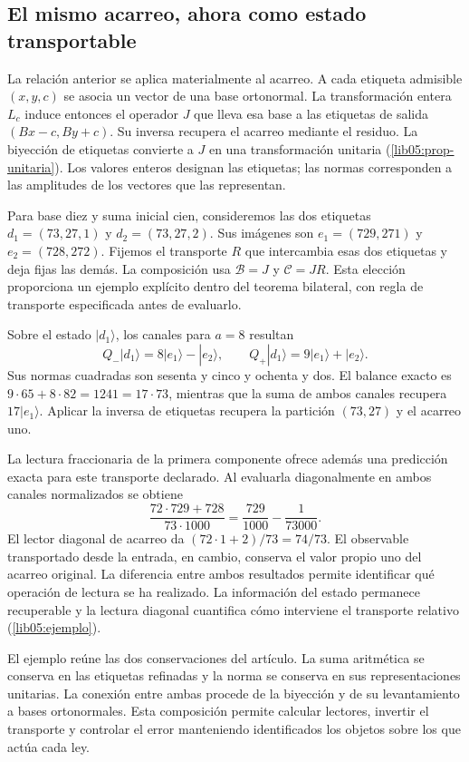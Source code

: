 \subsection*{El mismo acarreo, ahora como estado transportable}
\label{libnar:ejemplo}

La relación anterior se aplica materialmente al acarreo. A cada
etiqueta admisible \((x,y,c)\) se asocia un vector de una base
ortonormal. La transformación entera \(L_c\) induce entonces el
operador \(J\) que lleva esa base a las etiquetas de salida
\((Bx-c,By+c)\). Su inversa recupera el acarreo mediante el
residuo. La biyección de etiquetas convierte a \(J\) en una
transformación unitaria (\cref{lib05:prop-unitaria}). Los valores
enteros designan las etiquetas; las normas corresponden a las
amplitudes de los vectores que las representan.

Para base diez y suma inicial cien, consideremos las dos etiquetas
\(d_1=(73,27,1)\) y \(d_2=(73,27,2)\). Sus imágenes son
\(e_1=(729,271)\) y \(e_2=(728,272)\). Fijemos el transporte
\(R\) que intercambia esas dos etiquetas y deja fijas las demás.
La composición usa \(\mathcal B=J\) y \(\mathcal C=JR\).
Esta elección proporciona un ejemplo explícito dentro del teorema
bilateral, con regla de transporte especificada antes de evaluarlo.

Sobre el estado \(|d_1\rangle\), los canales para \(a=8\)
resultan
\[
 Q_-|d_1\rangle=8|e_1\rangle-|e_2\rangle,
 \qquad
 Q_+|d_1\rangle=9|e_1\rangle+|e_2\rangle.
\]
Sus normas cuadradas son sesenta y cinco y ochenta y dos. El balance
exacto es \(9\cdot65+8\cdot82=1241=17\cdot73\), mientras
que la suma de ambos canales recupera \(17|e_1\rangle\).
Aplicar la inversa de etiquetas recupera la partición \((73,27)\)
y el acarreo uno.

La lectura fraccionaria de la primera componente ofrece además una
predicción exacta para este transporte declarado. Al evaluarla
diagonalmente en ambos canales normalizados se obtiene
\[
 \frac{72\cdot729+728}{73\cdot1000}
   =\frac{729}{1000}-\frac{1}{73000}.
\]
El lector diagonal de acarreo da \((72\cdot1+2)/73=74/73\).
El observable transportado desde la entrada, en cambio, conserva
el valor propio uno del acarreo original. La diferencia entre ambos
resultados permite identificar qué operación de lectura se ha
realizado. La información del estado permanece recuperable y la
lectura diagonal cuantifica cómo interviene el transporte relativo
(\cref{lib05:ejemplo}).

El ejemplo reúne las dos conservaciones del artículo. La suma
aritmética se conserva en las etiquetas refinadas y la norma se
conserva en sus representaciones unitarias. La conexión entre ambas
procede de la biyección y de su levantamiento a bases ortonormales.
Esta composición permite calcular lectores, invertir el transporte
y controlar el error manteniendo identificados los objetos sobre
los que actúa cada ley.

